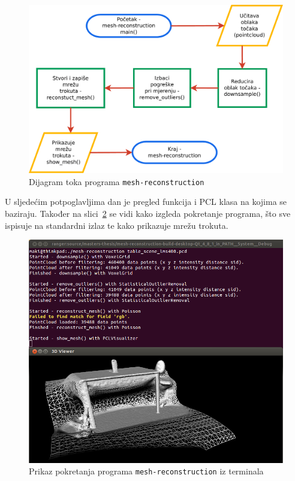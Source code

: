 
\begin{figure}[h]
\renewcommand{\figurename}{Grafikon}
\centering
\includegraphics[scale=0.5]{figures/flowchart.pdf}
\caption{Dijagram toka programa \texttt{mesh-reconstruction} }
\label{fig:flowchart}
\end{figure}

U sljedećim potpoglavljima dan je pregled funkcija i PCL klasa na kojima
se baziraju. Također na slici~\ref{fig:running-mesh-reconstruction} se
vidi kako izgleda pokretanje programa, što sve ispisuje na standardni
izlaz te kako prikazuje mrežu trokuta.

\newpage
\setcounter{figure}{0}
\begin{figure}[h]
\centering
\includegraphics[scale=0.5]{figures/running-mesh-reconstruction.png}
\caption{Prikaz pokretanja programa \texttt{mesh-reconstruction} iz
terminala}
\label{fig:running-mesh-reconstruction}
\end{figure}

